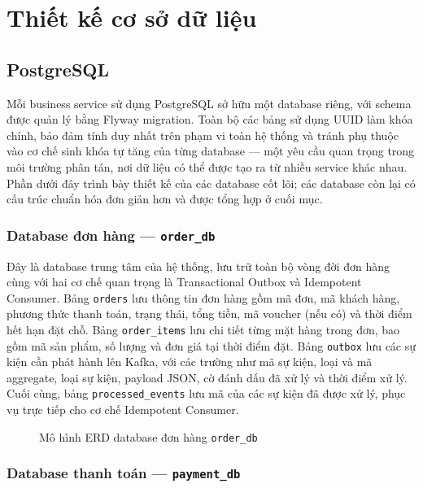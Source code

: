 \documentclass[../DoAn.tex]{subfiles}
\begin{document}
{\section{Thiết kế cơ sở dữ liệu}
\label{section:4.5}

\subsection{PostgreSQL}

Mỗi business service sử dụng PostgreSQL sở hữu một database riêng, với schema được quản lý
bằng Flyway migration. Toàn bộ các bảng sử dụng UUID làm khóa chính, bảo đảm tính duy nhất
trên phạm vi toàn hệ thống và tránh phụ thuộc vào cơ chế sinh khóa tự tăng của từng database
--- một yêu cầu quan trọng trong môi trường phân tán, nơi dữ liệu có thể được tạo ra từ nhiều
service khác nhau. Phần dưới đây trình bày thiết kế của các database cốt lõi; các database
còn lại có cấu trúc chuẩn hóa đơn giản hơn và được tổng hợp ở cuối mục.

\subsubsection*{Database đơn hàng --- \texttt{order\_db}}

Đây là database trung tâm của hệ thống, lưu trữ toàn bộ vòng đời đơn hàng cùng với hai cơ chế
quan trọng là Transactional Outbox và Idempotent Consumer. Bảng \texttt{orders} lưu thông tin
đơn hàng gồm mã đơn, mã khách hàng, phương thức thanh toán, trạng thái, tổng tiền, mã voucher
(nếu có) và thời điểm hết hạn đặt chỗ. Bảng \texttt{order\_items} lưu chi tiết từng mặt hàng
trong đơn, bao gồm mã sản phẩm, số lượng và đơn giá tại thời điểm đặt. Bảng \texttt{outbox}
lưu các sự kiện cần phát hành lên Kafka, với các trường như mã sự kiện, loại và mã aggregate,
loại sự kiện, payload JSON, cờ đánh dấu đã xử lý và thời điểm xử lý. Cuối cùng, bảng
\texttt{processed\_events} lưu mã của các sự kiện đã được xử lý, phục vụ trực tiếp cho cơ chế
Idempotent Consumer.

\begin{figure}[!H]
    \centering
    \caption{Mô hình ERD database đơn hàng \texttt{order\_db}}
    \label{fig:erd-order}
\end{figure}

\subsubsection*{Database thanh toán --- \texttt{payment\_db}}

}
\end{document}
